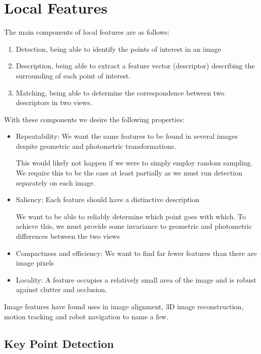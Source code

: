 \documentclass{article}
\begin{document}
\section{Local Features}

The main components of local features are as follows:

\begin{enumerate}
\item Detection, being able to identify the points of interest in an image
  \item Description, being able to extract a feature vector (descriptor) describing the surrounding of each point of interest.
  \item Matching, being able to determine the correspondence between two descriptors in two views.
\end{enumerate}

With these components we desire the following properties:

\begin{itemize}
  \item Repeatability: We want the same features to be found in several images despite geometric and photometric transformations.

        This would likely not happen if we were to simply employ random sampling. We require this to be the case at least partially as we must run detection separately on each image.

  \item Saliency: Each feature should have a distinctive description

        We want to be able to reliably determine which point goes with which. To achieve this, we must provide some invariance to geometric and photometric differences between the two views

  \item Compactness and efficiency: We want to find far fewer features than there are image pixels
  \item Locality: A feature occupies a relatively small area of the image and is robust against clutter and occlusion.
\end{itemize}

Image features have found uses in image alignment, 3D image reconstruction, motion tracking and robot navigation to name a few.

\subsection{Key Point Detection}
\end{document}
